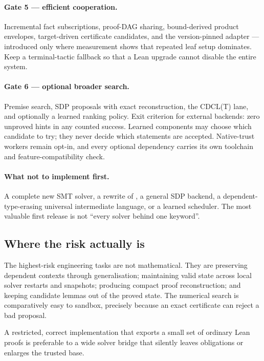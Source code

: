 \paragraph{Gate 5 --- efficient cooperation.}
Incremental fact subscriptions, proof-DAG sharing, bound-derived product
envelopes, target-driven certificate candidates, and the version-pinned adapter
--- introduced only where measurement shows that repeated leaf setup dominates.
Keep a terminal-tactic fallback so that a Lean upgrade cannot disable the entire
system.

\paragraph{Gate 6 --- optional broader search.}
Premise search, SDP proposals with exact reconstruction, the CDCL(T) lane, and
optionally a learned ranking policy. Exit criterion for external backends: zero
unproved hints in any counted success. Learned components may choose which
candidate to try; they never decide which statements are accepted.
Native-trust workers remain opt-in, and every optional dependency carries its own
toolchain and feature-compatibility check.

\paragraph{What not to implement first.}
A complete new SMT solver, a rewrite of \grind{}, a general SDP backend, a
dependent-type-erasing universal intermediate language, or a learned scheduler.
The most valuable first release is not ``every solver behind one keyword''.

\subsection{Where the risk actually is}

The highest-risk engineering tasks are not mathematical. They are preserving
dependent contexts through generalisation; maintaining valid state across local
solver restarts and snapshots; producing compact proof reconstruction; and
keeping candidate lemmas out of the proved state. The numerical search is
comparatively easy to sandbox, precisely because an exact certificate can reject
a bad proposal.

A restricted, correct implementation that exports a small set of ordinary Lean
proofs is preferable to a wide solver bridge that silently leaves obligations or
enlarges the trusted base.
